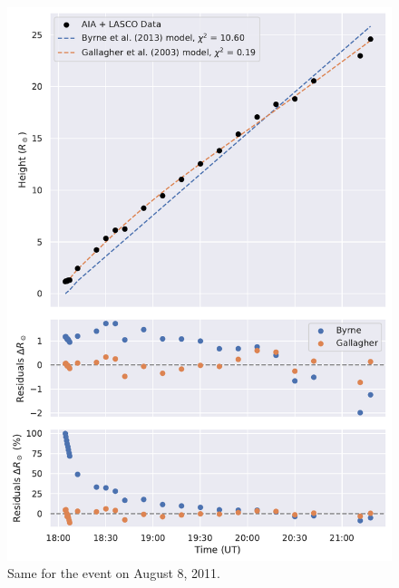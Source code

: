 \begin{figure}[!htp]
	\centering
	\includegraphics[width=0.8\hsize]{chapter2/figs/appendix/height_profile_residuals_aia_lasco_110808_01.pdf}
	\caption{Same for the event on August 8, 2011.}
\end{figure}

